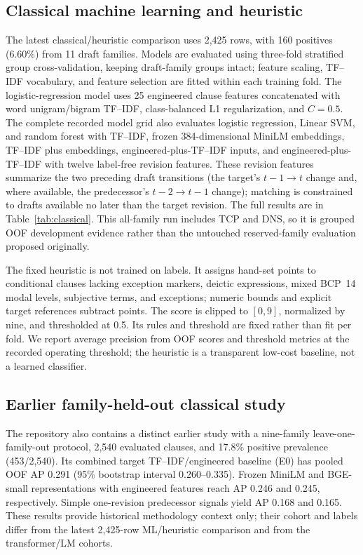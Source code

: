 \documentclass[12pt,a4paper,oneside]{report}
\begin{document}
\subsection{Classical machine learning and heuristic}

The latest classical/heuristic comparison uses 2,425 rows, with 160 positives (6.60\%) from 11 draft families. Models are evaluated using three-fold stratified group cross-validation, keeping draft-family groups intact; feature scaling, TF--IDF vocabulary, and feature selection are fitted within each training fold. The logistic-regression model uses 25 engineered clause features concatenated with word unigram/bigram TF--IDF, class-balanced L1 regularization, and $C=0.5$. The complete recorded model grid also evaluates logistic regression, Linear SVM, and random forest with TF--IDF, frozen 384-dimensional MiniLM embeddings, TF--IDF plus embeddings, engineered-plus-TF--IDF inputs, and engineered-plus-TF--IDF with twelve label-free revision features. These revision features summarize the two preceding draft transitions (the target's $t-1\!\to t$ change and, where available, the predecessor's $t-2\!\to t-1$ change); matching is constrained to drafts available no later than the target revision. The full results are in Table~\ref{tab:classical}. This all-family run includes TCP and DNS, so it is grouped OOF development evidence rather than the untouched reserved-family evaluation proposed originally.

The fixed heuristic is not trained on labels. It assigns hand-set points to conditional clauses lacking exception markers, deictic expressions, mixed BCP~14 modal levels, subjective terms, and exceptions; numeric bounds and explicit target references subtract points. The score is clipped to $[0,9]$, normalized by nine, and thresholded at 0.5. Its rules and threshold are fixed rather than fit per fold. We report average precision from OOF scores and threshold metrics at the recorded operating threshold; the heuristic is a transparent low-cost baseline, not a learned classifier.

\subsection{Earlier family-held-out classical study}

The repository also contains a distinct earlier study with a nine-family leave-one-family-out protocol, 2,540 evaluated clauses, and 17.8\% positive prevalence (453/2,540). Its combined target TF--IDF/engineered baseline (E0) has pooled OOF AP 0.291 (95\% bootstrap interval 0.260--0.335). Frozen MiniLM and BGE-small representations with engineered features reach AP 0.246 and 0.245, respectively. Simple one-revision predecessor signals yield AP 0.168 and 0.165. These results provide historical methodology context only; their cohort and labels differ from the latest 2,425-row ML/heuristic comparison and from the transformer/LM cohorts.
\end{document}

